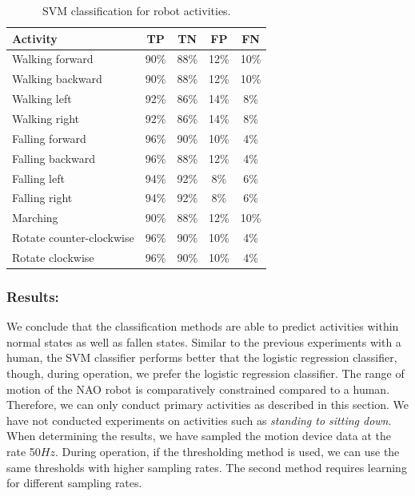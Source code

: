 \documentclass[letterpaper]{article}
\begin{document}
\begin{sloppy}
\begin{table}[!ht]
\caption{SVM classification for robot activities.}
	\label{tab:robot-svm-class}
	\centering
		\begin{tabular} {| l | c | c | c | c | }
		\hline
			{\bf Activity} & {\bf  TP}  &	{\bf TN}  &	{\bf FP} &	{\bf FN} \\ 
\hline
			Walking forward	& 90\%	& 88\%	& 12\%	& 10\% \\ \hline
			Walking backward	& 90\%	& 88\%	& 12\%	& 10\% \\ \hline
			Walking left	& 92\%	& 86\%	& 14\%	& 8\% \\ \hline
			Walking right	& 92\%	& 86\%	& 14\%	& 8\% \\ \hline
			Falling forward	& 96\%	& 90\%	& 10\%	& 4\%	 \\ \hline
			Falling backward	& 96\%	& 88\%	& 12\%	& 4\%	 \\ \hline
			Falling left	& 94\%	& 92\%	& 8\%	& 6\%	 \\ \hline
			Falling right	& 94\%	& 92\%	& 8\%	& 6\%	 \\ \hline
			Marching	& 90\%	& 88\%	& 12\%	& 10\%	 \\ \hline
			Rotate counter-clockwise	& 96\%	& 90\%	& 10\%	& 4\%	 \\ \hline
			Rotate clockwise	& 96\%	& 90\%	& 10\%	& 4\%	 \\ \hline
		\end{tabular}
\end{table}

\subsubsection{Results:} 
We conclude that the classification methods are able to predict activities within normal states 
as well as fallen states. Similar to the previous experiments with a human, the SVM classifier performs 
better that the logistic regression classifier, though, during operation, we prefer the logistic regression classifier. The range of motion of the NAO robot is comparatively constrained compared to a 
human. Therefore, we can only conduct primary activities as described in this section. We have not 
conducted experiments on activities such as \textit{standing to sitting down}. When determining the results, we 
have sampled the motion device data at the rate 50$Hz$. During operation, if the 
thresholding method is used, we can use the same thresholds with higher sampling rates. The second 
method requires learning for different sampling rates.



\end{sloppy}
\end{document}
